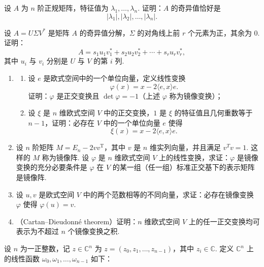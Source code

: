 \begin{exercise}
\begin{exgroup}
        \item 设 $A$ 为 $n$ 阶正规矩阵，特征值为 $\lambda_1, \ldots, \lambda_n$. 证明：$A$ 的奇异值恰好是
        \[
            |\lambda_1|, |\lambda_2|, \ldots, |\lambda_n|.
        \]

        \item 设 $A = U\Sigma V^*$ 是矩阵 $A$ 的奇异值分解，$\Sigma$ 的对角线上前 $r$ 个元素为正，其余为 $0$. 证明：
        \[
            A = s_1u_1v_1^* + s_2u_2v_2^* + \cdots + s_ru_rv_r^*,
        \]
        其中 $u_i$ 与 $v_i$ 分别是 $U$ 与 $V$ 的第 $i$ 列.
    \end{exgroup}

    \begin{exgroup}
        \item \label{item:24:镜像变换}
        \begin{enumerate}
            \item \begin{enumerate}
                      \item 设 $e$ 是欧式空间中的一个单位向量，定义线性变换
                            \[
                                \varphi(x) = x - 2\langle e, x \rangle e.
                            \]
                            证明：$\varphi$ 是正交变换且 $\det \varphi = -1$（上述 $\varphi$ 称为镜像变换）；
                      \item 设 $\xi$ 是 $n$ 维欧式空间 $V$ 中的正交变换，$1$ 是 $\xi$ 的特征值且几何重数等于 $n - 1$，证明：必存在 $V$ 中的一个单位向量 $e$ 使得
                            \[
                                \xi(x) = x - 2\langle e, x \rangle e.
                            \]
                  \end{enumerate}
            \item 设 $n$ 阶矩阵 $M = E_n - 2v v^{\mathrm{T}}$，其中 $v$ 是 $n$ 维实列向量，并且满足 $v^{T}v = 1$. 这样的 $M$ 称为镜像阵. 设 $\varphi$ 是 $n$ 维欧式空间 $V$ 上的线性变换，求证：$\varphi$ 是镜像变换的充分必要条件是 $\varphi$ 在 $V$ 的某一组（任一组）标准正交基下的表示矩阵是镜像阵.
            \item 设 $u, v$ 是欧式空间 $V$ 中的两个范数相等的不同向量，求证：必存在镜像变换 $\varphi$ 使得 $\varphi(u) = v$.
            \item （Cartan–Dieudonné theorem）证明：$n$ 维欧式空间 $V$ 上的任一正交变换均可表示为不超过 $n$ 个镜像变换之积.
        \end{enumerate}
        \item 设 $n$ 为一正整数，记 $z \in \mathbb{C}^n$ 为 $z = (z_0, z_1, \ldots, z_{n - 1})$，其中 $z_i \in \mathbb{C}$. 定义 $\mathbb{C}^n$ 上的线性函数 $\omega_0, \omega_1, \ldots, \omega_{n - 1}$ 如下：

\end{exgroup}
\end{exercise}
